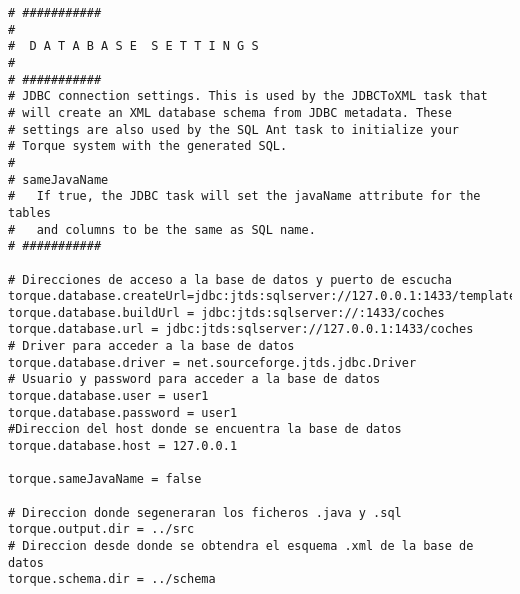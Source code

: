 \begin{lstlisting}
# ###########
#
#  D A T A B A S E  S E T T I N G S
#
# ###########
# JDBC connection settings. This is used by the JDBCToXML task that
# will create an XML database schema from JDBC metadata. These
# settings are also used by the SQL Ant task to initialize your
# Torque system with the generated SQL.
#
# sameJavaName
#   If true, the JDBC task will set the javaName attribute for the tables
#   and columns to be the same as SQL name.
# ###########

# Direcciones de acceso a la base de datos y puerto de escucha
torque.database.createUrl=jdbc:jtds:sqlserver://127.0.0.1:1433/template1/coches
torque.database.buildUrl = jdbc:jtds:sqlserver://:1433/coches
torque.database.url = jdbc:jtds:sqlserver://127.0.0.1:1433/coches
# Driver para acceder a la base de datos
torque.database.driver = net.sourceforge.jtds.jdbc.Driver
# Usuario y password para acceder a la base de datos
torque.database.user = user1
torque.database.password = user1
#Direccion del host donde se encuentra la base de datos
torque.database.host = 127.0.0.1

torque.sameJavaName = false

# Direccion donde segeneraran los ficheros .java y .sql
torque.output.dir = ../src
# Direccion desde donde se obtendra el esquema .xml de la base de datos
torque.schema.dir = ../schema
\end{lstlisting}